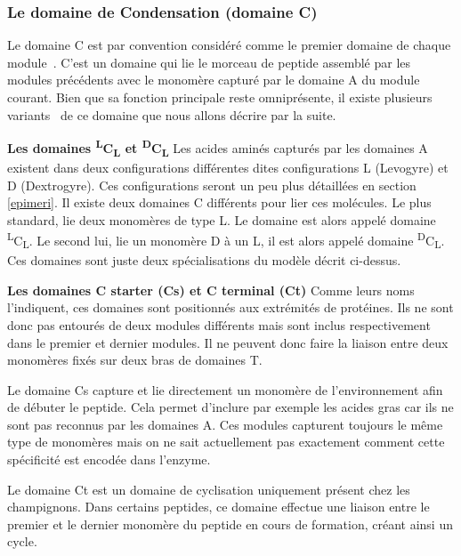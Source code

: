 \subsubsection{Le domaine de Condensation (domaine C)}

Le domaine C est par convention considéré comme le premier domaine de chaque module~\cite{stachelhaus_peptide_1998}.
C'est un domaine qui lie le morceau de peptide assemblé par les modules précédents avec le monomère capturé par le domaine A du module courant.
Bien que sa fonction principale reste omniprésente, il existe plusieurs variants~\cite{rausch_phylogenetic_2007} de ce domaine que nous allons décrire par la suite.

\textbf{Les domaines \textsuperscript{L}C\textsubscript{L} et \textsuperscript{D}C\textsubscript{L}}
Les acides aminés capturés par les domaines A existent dans deux configurations différentes dites configurations L (Levogyre) et D (Dextrogyre).
Ces configurations seront un peu plus détaillées en section \ref{epimeri}.
Il existe deux domaines C différents pour lier ces molécules.
Le plus standard, lie deux monomères de type L. Le domaine est alors appelé domaine \textsuperscript{L}C\textsubscript{L}.
Le second lui, lie un monomère D à un L, il est alors appelé domaine \textsuperscript{D}C\textsubscript{L}.
Ces domaines sont juste deux spécialisations du modèle décrit ci-dessus.

\textbf{Les domaines C starter (Cs) et C terminal (Ct)}
Comme leurs noms l'indiquent, ces domaines sont positionnés aux extrémités de protéines.
Ils ne sont donc pas entourés de deux modules différents mais sont inclus respectivement dans le premier et dernier modules.
Il ne peuvent donc faire la liaison entre deux monomères fixés sur deux bras de domaines T.

Le domaine Cs capture et lie directement un monomère de l'environnement afin de débuter le peptide.
Cela permet d'inclure par exemple les acides gras car ils ne sont pas reconnus par les domaines A.
Ces modules capturent toujours le même type de monomères mais on ne sait actuellement pas exactement comment cette spécificité est encodée dans l'enzyme.

Le domaine Ct est un domaine de cyclisation uniquement présent chez les champignons.
Dans certains peptides, ce domaine effectue une liaison entre le premier et le dernier monomère du peptide en cours de formation, créant ainsi un cycle\cite{gao_cyclization_2012}.

